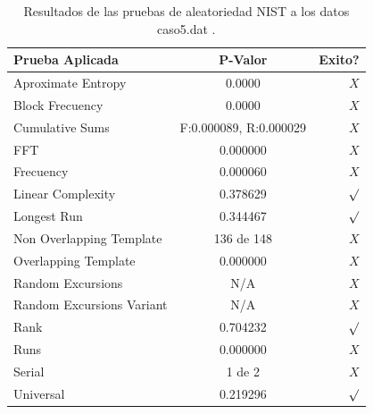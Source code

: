 \documentclass[10pt]{IEEEtran}
\begin{document}
\begin{table}[H]
\caption{Resultados de las pruebas de aleatoriedad NIST a los datos caso5.dat .}
\label{caso1}
\begin{center}
\begin{small}
\begin{tabular}{|l|c|r|}
\hline

Prueba Aplicada &  P-Valor & Exito? \\
\hline

Aproximate Entropy    &    0.0000 & $X$ \\

Block Frecuency  & 0.0000  &  $X$  \\

Cumulative Sums    &   F:0.000089, R:0.000029   & $X$ \\

FFT    &   0.000000 &   $X$      \\

Frecuency     &  0.000060 &  $X$   \\

Linear Complexity      & 0.378629 & $\surd$ \\

Longest Run      &    0.344467 &   $\surd$     \\

Non Overlapping Template      & 136 de 148    &     $X$          \\

Overlapping Template      &   0.000000  &       $X$        \\

Random Excursions      & N/A  &    $X$      \\

Random Excursions Variant & N/A &     $X$    \\

Rank & 0.704232 &      $\surd$      \\

Runs &      0.000000  &     $X$        \\

Serial &     1 de 2    &     $X$        \\

Universal &       0.219296 &   $\surd$            \\

\hline

\end{tabular}
\end{small}
\end{center}
\end{table}
\end{document}
